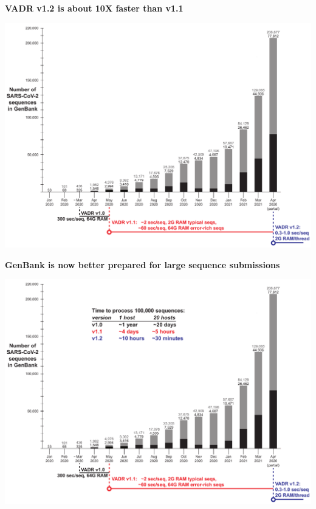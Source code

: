 \documentclass[landscape]{slides}
\begin{document}
\begin{slide}
\begin{center}
\textbf{VADR v1.2 is about 10X faster than v1.1}

\includegraphics[width=10.25in]{figs/sars-counts-jan2020-apr2021-slide2}
\end{center}

\vfill
\end{slide}
\begin{slide}
\begin{center}
\textbf{GenBank is now better prepared for large sequence submissions}

\includegraphics[width=10.25in]{figs/sars-counts-jan2020-apr2021-slide3}
\end{center}

\vfill
\end{slide}
\end{document}
